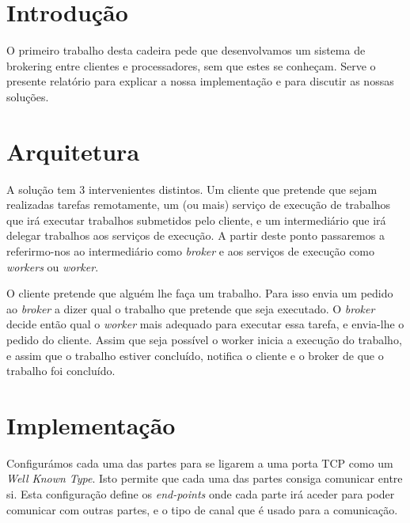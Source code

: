 \documentclass[a4paper]{article}
\begin{document}

\newpage
\thispagestyle{empty} %

\tableofcontents

\newpage
\setcounter{page}{1} %

\section{Introdução}

O primeiro trabalho desta cadeira pede que desenvolvamos um sistema de brokering entre clientes e processadores, sem que estes se conheçam. Serve o presente relatório para
explicar a nossa implementação e para discutir as nossas soluções.

\section{Arquitetura}

A solução tem 3 intervenientes distintos. Um cliente que pretende que sejam realizadas tarefas remotamente, um (ou mais) serviço de execução de trabalhos que irá executar trabalhos submetidos pelo cliente, e um intermediário que irá delegar trabalhos aos serviços de execução. A partir deste ponto passaremos a referirmo-nos ao intermediário como \emph{broker} e aos serviços de execução como \emph{workers} ou \emph{worker}.

O cliente pretende que alguém lhe faça um trabalho. Para isso envia um pedido ao \emph{broker} a dizer qual o trabalho que pretende que seja executado. O \emph{broker} decide então qual o \emph{worker} mais adequado para executar essa tarefa, e envia-lhe o pedido do cliente. Assim que seja possível o worker inicia a execução do trabalho, e assim que o trabalho estiver concluído, notifica o cliente e o broker de que o trabalho foi concluído.

\section{Implementação}

Configurámos cada uma das partes para se ligarem a uma porta TCP como um \emph{Well Known Type}. Isto permite que cada uma das partes consiga comunicar entre si. Esta configuração define os \emph{end-points} onde cada parte irá aceder para poder comunicar com outras partes, e o tipo de canal que é usado para a comunicação.
\end{document}
